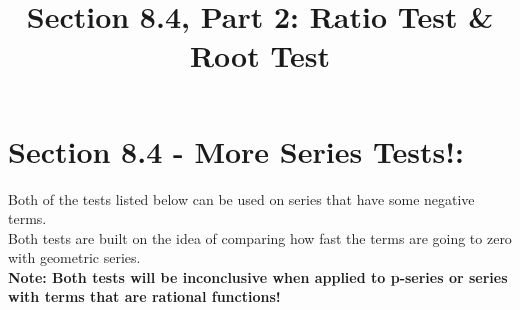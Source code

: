 \documentclass[10pt]{article}
\begin{document}
\graphicspath{{Series_Strategies/}}

\newcommand{\an}{\lbrace a_n \rbrace}
\newcommand{\Sum}{\sum_{n=1}^\infty }
\newcommand{\SumZero}{\sum_{n=0}^\infty }

\everymath{\displaystyle}

\renewcommand{\myTitle}{	MATH 1336: Calculus III}

\renewcommand{\mySubTitle}{Section 8.4, Part 2: Ratio Test \& Root Test}%


\title{\mySubTitle}\date{}
\maketitle




\setlength{\columnseprule}{.4pt}
\setlength{\columnsep}{3em}

\section*{Section 8.4 - More Series Tests!: }
Both of the tests listed below can be used on series that have some negative terms.\\
Both tests are built on the idea of comparing how fast the terms are going to zero with geometric series.\\
\textbf{Note: Both tests will be inconclusive when applied to p-series or series with terms that are rational functions!}\\


\vspace*{.1in}

\end{document}
